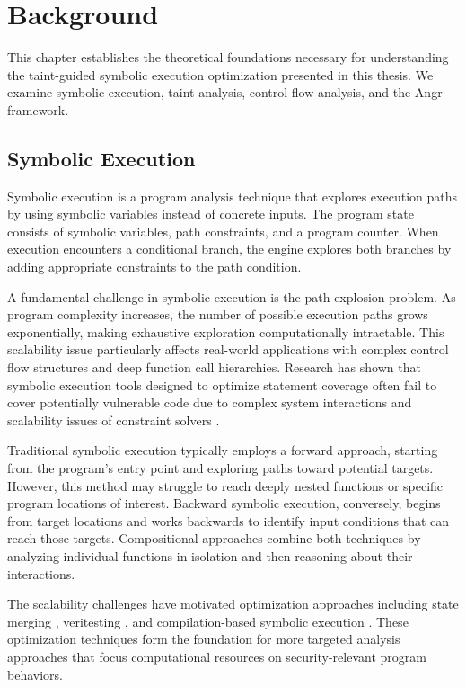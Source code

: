 \chapter{Background}

This chapter establishes the theoretical foundations necessary for understanding the taint-guided symbolic execution optimization presented in this thesis. We examine symbolic execution, taint analysis, control flow analysis, and the Angr framework.

\section{Symbolic Execution}

Symbolic execution is a program analysis technique that explores execution paths by using symbolic variables instead of concrete inputs. The program state consists of symbolic variables, path constraints, and a program counter. When execution encounters a conditional branch, the engine explores both branches by adding appropriate constraints to the path condition.

A fundamental challenge in symbolic execution is the path explosion problem. As program complexity increases, the number of possible execution paths grows exponentially, making exhaustive exploration computationally intractable. This scalability issue particularly affects real-world applications with complex control flow structures and deep function call hierarchies. Research has shown that symbolic execution tools designed to optimize statement coverage often fail to cover potentially vulnerable code due to complex system interactions and scalability issues of constraint solvers \cite{schwartz_all_2010}.

Traditional symbolic execution typically employs a forward approach, starting from the program's entry point and exploring paths toward potential targets. However, this method may struggle to reach deeply nested functions or specific program locations of interest. Backward symbolic execution, conversely, begins from target locations and works backwards to identify input conditions that can reach those targets. Compositional approaches combine both techniques by analyzing individual functions in isolation and then reasoning about their interactions.

The scalability challenges have motivated optimization approaches including state merging \cite{kuznetsov_efficient_2012}, veritesting \cite{avgerinos_enhancing_2014}, and compilation-based symbolic execution \cite{poeplau_symbolic_2020}. These optimization techniques form the foundation for more targeted analysis approaches that focus computational resources on security-relevant program behaviors.

